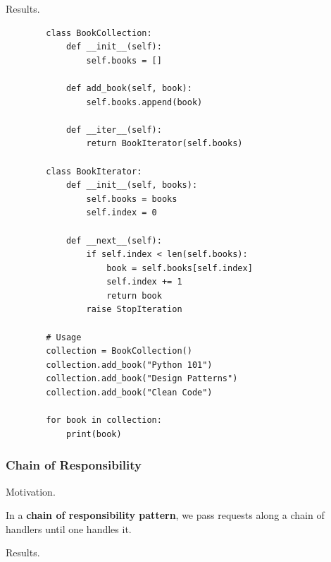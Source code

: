     Results. 

    \begin{example}
      \label{ex:case-study-8}
      \begin{lstlisting}
        class BookCollection:
            def __init__(self):
                self.books = []
            
            def add_book(self, book):
                self.books.append(book)
            
            def __iter__(self):
                return BookIterator(self.books)

        class BookIterator:
            def __init__(self, books):
                self.books = books
                self.index = 0
            
            def __next__(self):
                if self.index < len(self.books):
                    book = self.books[self.index]
                    self.index += 1
                    return book
                raise StopIteration

        # Usage
        collection = BookCollection()
        collection.add_book("Python 101")
        collection.add_book("Design Patterns")
        collection.add_book("Clean Code")
        
        for book in collection:
            print(book) 
      \end{lstlisting}
    \end{example}

  \subsubsection{Chain of Responsibility}

    Motivation. 

    \begin{definition}
      \label{def:chain-of-responsibility}
      In a \textbf{chain of responsibility pattern}, we pass requests along a chain of handlers until one handles it. 
    \end{definition}

    Results. 

